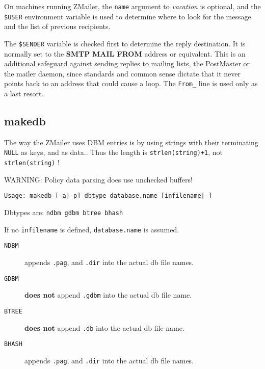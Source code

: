 On machines running ZMailer, the {\tt name} argument 
to {\em vacation\/} is optional, and the {\tt \$USER} 
environment variable is used to determine where to look for the 
message and the list of previous recipients.

The {\tt \$SENDER} variable is checked first to determine 
the reply destination. It is normally set to the {\bf SMTP} 
{\bf MAIL FROM} address or equivalent. This is an additional 
safeguard against sending replies to mailing lists, the PostMaster 
or the mailer daemon, since standards and common sense dictate that 
it never points back to an address that could cause a loop. The 
{\tt From\_} line is used only as a last resort.




\subsection{makedb}



The way the ZMailer uses DBM entries is by using strings with 
their terminating {\tt NULL} as keys, and as data.. Thus 
the length is {\tt strlen(string)+1}, not {\tt strlen(string)} !

WARNING: Policy data parsing does use unchecked buffers!

\begin{verbatim}
Usage: makedb [-a|-p] dbtype database.name [infilename|-]
\end{verbatim}


Dbtypes are: {\tt ndbm gdbm btree bhash}

If no {\tt infilename} is defined, {\tt database.name} is assumed.

\begin{description}
\item[{\tt NDBM}] \mbox{}

appends {\tt .pag}, and {\tt .dir}
into the actual db file names.

\item[{\tt GDBM}] \mbox{}

{\bf does not} append {\tt .gdbm}
into the actual db file name.

\item[{\tt BTREE}] \mbox{}

{\bf does not} append {\tt .db}
into the actual db file name.

\item[{\tt BHASH}] \mbox{}

appends {\tt .pag}, and {\tt .dir}
into the actual db file names.

\end{description}



